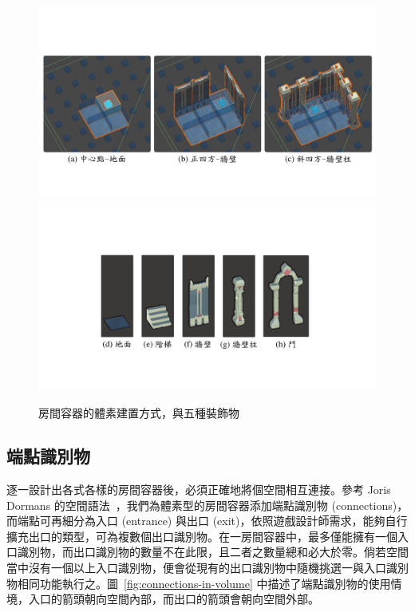 \begin{figure}[!htb]
  \begin{center}
    \includegraphics[width=1.0\textwidth]{figures/decorations-with-directions.pdf}
    \includegraphics[width=1.0\textwidth]{figures/decorations-with-directions-.pdf}
    \caption{房間容器的體素建置方式，與五種裝飾物}
    \label{fig:decorations-with-directions}
  \end{center}
\end{figure}

\subsection{端點識別物}
\label{ssec:method-spacepieces-connections}

逐一設計出各式各樣的房間容器後，必須正確地將個空間相互連接。參考 Joris Dormans 的空間語法~\cite{dormans2012engineering}，我們為體素型的房間容器添加端點識別物 (connections)，而端點可再細分為入口 (entrance) 與出口 (exit)，依照遊戲設計師需求，能夠自行擴充出口的類型，可為複數個出口識別物。在一房間容器中，最多僅能擁有一個入口識別物，而出口識別物的數量不在此限，且二者之數量總和必大於零。倘若空間當中沒有一個以上入口識別物，便會從現有的出口識別物中隨機挑選一與入口識別物相同功能執行之。圖~\ref{fig:connections-in-volume} 中描述了端點識別物的使用情境，入口的箭頭朝向空間內部，而出口的箭頭會朝向空間外部。

